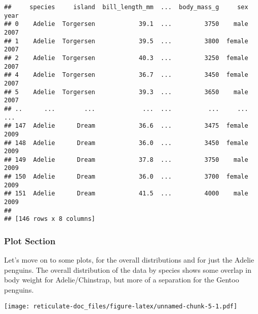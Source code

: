 \documentclass[
]{article}
\newenvironment{Shaded}{\begin{snugshade}}{\end{snugshade}}
\newcommand{\AttributeTok}[1]{\textcolor[rgb]{0.77,0.63,0.00}{#1}}
\newcommand{\FloatTok}[1]{\textcolor[rgb]{0.00,0.00,0.81}{#1}}
\newcommand{\FunctionTok}[1]{\textcolor[rgb]{0.00,0.00,0.00}{#1}}
\newcommand{\NormalTok}[1]{#1}
\newcommand{\OtherTok}[1]{\textcolor[rgb]{0.56,0.35,0.01}{#1}}
\newcommand{\SpecialCharTok}[1]{\textcolor[rgb]{0.00,0.00,0.00}{#1}}
\newcommand{\StringTok}[1]{\textcolor[rgb]{0.31,0.60,0.02}{#1}}
\begin{document}
\begin{verbatim}
##     species     island  bill_length_mm  ...  body_mass_g     sex  year
## 0    Adelie  Torgersen            39.1  ...         3750    male  2007
## 1    Adelie  Torgersen            39.5  ...         3800  female  2007
## 2    Adelie  Torgersen            40.3  ...         3250  female  2007
## 4    Adelie  Torgersen            36.7  ...         3450  female  2007
## 5    Adelie  Torgersen            39.3  ...         3650    male  2007
## ..      ...        ...             ...  ...          ...     ...   ...
## 147  Adelie      Dream            36.6  ...         3475  female  2009
## 148  Adelie      Dream            36.0  ...         3450  female  2009
## 149  Adelie      Dream            37.8  ...         3750    male  2009
## 150  Adelie      Dream            36.0  ...         3700  female  2009
## 151  Adelie      Dream            41.5  ...         4000    male  2009
## 
## [146 rows x 8 columns]
\end{verbatim}

\hypertarget{plot-section}{%
\subsubsection{Plot Section}\label{plot-section}}

Let's move on to some plots, for the overall distributions and for just
the Adelie penguins. The overall distribution of the data by species
shows some overlap in body weight for Adelie/Chinstrap, but more of a
separation for the Gentoo penguins.

\begin{Shaded}
\end{Shaded}

\texttt{[image: reticulate-doc\_files/figure-latex/unnamed-chunk-5-1.pdf]}
\end{document}
